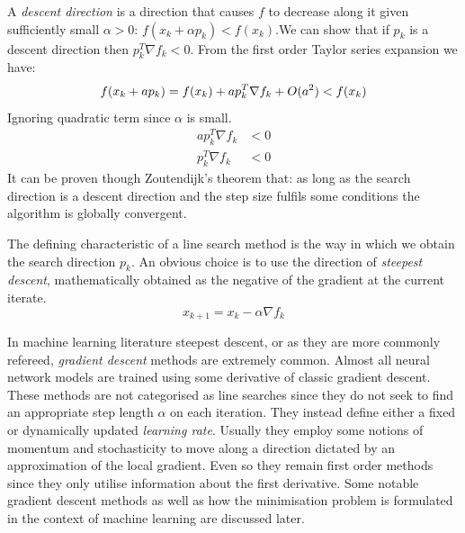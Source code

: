 \documentclass[11pt]{report}
\begin{document}
    A \textit{descent direction} is a direction that causes $f$ to decrease along it given sufficiently small $\alpha > 0$: $f(x_k + \alpha p_k) < f(x_k)$.We can show that if $p_k$ is a descent direction then $p_k^T \nabla f_k < 0$.
    From the first order Taylor series expansion we have:
    \begin{equation*}
        f(x_k+ap_k) = f(x_k) + a p_k^T \nabla f_k + O(a^2)< f(x_k) \\
    \end{equation*}
    Ignoring quadratic term since $\alpha$ is small.
    \begin{align*}
        a p_k^T \nabla f_k &< 0 \\
        p_k^T \nabla f_k &< 0
    \end{align*}
    It can be proven though Zoutendijk's theorem that: as long as the search direction is a descent direction and the step size fulfils some conditions the algorithm is globally convergent.

    The defining characteristic of a line search method is the way in which we obtain the search direction $p_k$.
    An obvious choice is to use the direction of \textit{steepest descent}, mathematically obtained as the negative of the gradient at the current iterate.
    \begin{equation}
        x_{k+1} = x_k - \alpha \nabla f_k
    \end{equation}

    In machine learning literature steepest descent, or as they are more commonly refereed, \textit{gradient descent} methods are extremely common.
    Almost all neural network models are trained using some derivative of classic gradient descent.
    These methods are not categorised as line searches since they do not seek to find an appropriate step length $\alpha$ on each iteration.
    They instead define either a fixed or dynamically updated \textit{learning rate}.
    Usually they employ some notions of momentum and stochasticity to move along a direction dictated by an approximation of the local gradient.
    Even so they remain first order methods since they only utilise information about the first derivative.
    Some notable gradient descent methods as well as how the minimisation problem is formulated in the context of machine learning are discussed later.
\end{document}
